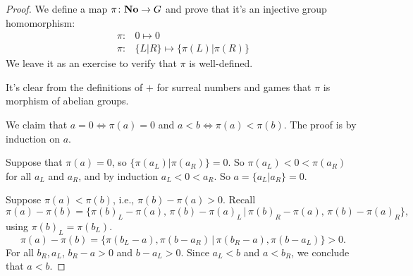 \begin{proof}
We define a map $\pi\colon\mathbf{No}\to G$ and prove that it's an injective group homomorphism:
\begin{align*}
\pi \colon& 0\mapsto 0 \\
\pi\colon& \{L | R\} \mapsto \{\pi(L) | \pi(R) \}
\end{align*}
We leave it as an exercise to verify that $\pi$ is well-defined.

It's clear from the definitions of $+$ for surreal numbers and games that $\pi$ is morphism of abelian groups.

We claim that $a=0 \iff \pi(a)=0$ and $a<b\iff \pi(a)<\pi(b)$. The proof is by induction on $a$.

Suppose that $\pi(a) = 0$, so $\{ \pi(a_L) | \pi(a_R) \} = 0$. So $\pi(a_L) < 0 < \pi(a_R)$ for all $a_L$ and $a_R$, and by
induction $a_L < 0 < a_R$. So $a = \{ a_L | a_R \} = 0$.

Suppose $\pi(a)<\pi(b)$, i.e., $\pi(b)-\pi(a)>0$. Recall
\[ \pi(a)-\pi(b) = \{ \pi(b)_L - \pi(a), \, \pi(b) - \pi(a)_L \,|\, \pi(b)_R - \pi(a),\, \pi(b) - \pi(a)_R \}, \]
using $\pi(b)_L = \pi(b_L)$.
\[ \pi(a) - \pi(b) = \{ \pi(b_L-a),\pi(b-a_R) \,|\, \pi(b_R-a),\pi(b-a_L)\}>0.\]
For all $b_R,a_L$, $b_R-a>0$ and $b-a_L>0$. Since $a_L<b$ and $a<b_R$, we conclude that $a<b$.
\end{proof}

